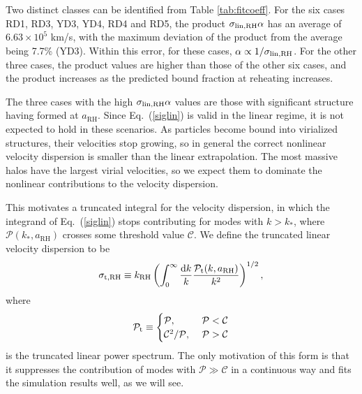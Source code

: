 \documentclass[a4paper,11pt]{article}
\newcommand{\rh}[1]{{#1}_{\mathrm{RH}}}
\newcommand{\diff}{\ensuremath{\mathrm{d}}}
\begin{document}
Two distinct classes can be identified from Table \ref{tab:fitcoeff}. For the six cases RD1, RD3, YD3, YD4, RD4 and RD5, the product $\sigma_{\rm lin,RH} \alpha$ has an average of $6.63 \times 10^5$ km/s, with the maximum deviation of the product from the average being 7.7\% (YD3). Within this error, for these cases, $ \alpha \propto 1/\sigma_{\rm lin,RH}$. For the other three cases, the product values are higher than those of the other six cases, and the product increases as the predicted bound fraction at reheating increases. 

The three cases with the high $\sigma_{\rm lin,RH} \alpha$ values are those with significant structure having formed at $\rh{a}$. 
Since Eq.~(\ref{siglin}) is valid in the linear regime, it is not expected to hold in these scenarios. As particles become bound into virialized structures, their velocities stop growing, so in general the correct nonlinear velocity dispersion is smaller than the linear extrapolation. The most massive halos have the largest virial velocities, so we expect them to dominate the nonlinear contributions to the velocity dispersion.

This motivates a truncated integral for the velocity dispersion, in which the integrand of Eq.~(\ref{siglin}) stops contributing for modes with $k>k_*$, where $\mathcal{P}(k_*,\rh{a})$ crosses some threshold value $\mathcal{C}$. We define the truncated linear velocity dispersion to be \begin{equation} \label{truncsigv}
    \sigma_{\rm t,RH} \equiv \rh{k} \left( \int_0^\infty \frac{\diff k}{k} \frac{\mathcal{P}_{\rm t}(k,\rh{a})}{k^2}\right)^{1/2},
\end{equation} where \begin{equation} \label{truncP}
    \mathcal{P}_{\rm t} \equiv \begin{cases}
        \mathcal{P}, &\  \mathcal{P}<\mathcal{C} \\
        \mathcal{C}^2 / \mathcal{P},  &\  \mathcal{P}>\mathcal{C}
    \end{cases} 
\end{equation} is the truncated linear power spectrum. The only motivation of this form is that it suppresses the contribution of modes with $\mathcal{P}\gg\mathcal{C}$ in a continuous way and fits the simulation results well, as we will see.
\end{document}
